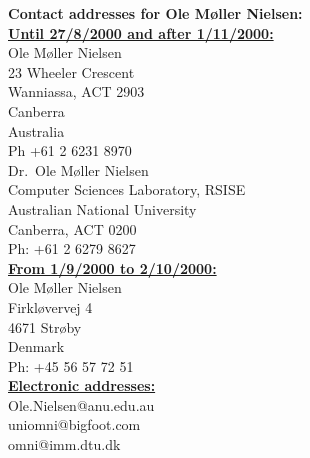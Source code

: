 \documentclass[12pt]{letter}
\begin{document}
\address{}

\signature{Ole M{\o}ller Nielsen}
\begin{letter}{}


{\LARGE \bf Contact addresses for Ole M{\o}ller Nielsen:} \\

\noindent \underline{\bf Until 27/8/2000 and after 1/11/2000:} \\ 

Ole M{\o}ller Nielsen \\
23 Wheeler Crescent \\
Wanniassa, ACT 2903 \\
Canberra \\
Australia \\
Ph +61 2 6231 8970 \\

Dr.\ Ole M{\o}ller Nielsen     \\
Computer Sciences Laboratory, RSISE   \\
Australian National University \\
Canberra, ACT 0200 \\
Ph: +61 2 6279 8627 \\


\noindent \underline{\bf From 1/9/2000 to 2/10/2000:} \\

Ole M{\o}ller Nielsen \\
Firkl{\o}vervej 4 \\
4671 Str{\o}by \\
Denmark \\
Ph: +45 56 57 72 51 \\


\noindent \underline{\bf Electronic addresses:} \\

Ole.Nielsen@anu.edu.au \\
uniomni@bigfoot.com \\
omni@imm.dtu.dk 



\end{letter}
\end{document}
